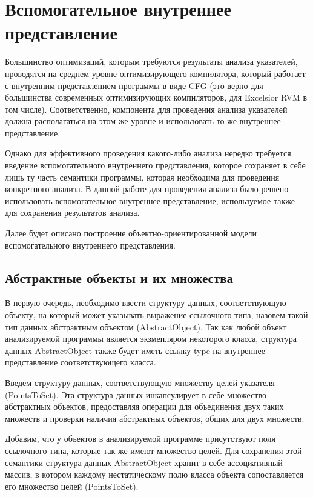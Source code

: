 \documentclass[14pt,titlepage]{extarticle}
\newcommand{\eng}[1]{{\English#1}}
\let\oldsection\section
\renewcommand{\section}{\newpage\oldsection}
\begin{document}
  \section{Вспомогательное внутреннее представление}
    \label{section:analysis_aux_ir}

    Большинство оптимизаций, которым требуются результаты анализа указателей,
    проводятся на среднем уровне оптимизирующего компилятора, который
    работает с внутренним представлением программы в виде CFG (это верно для
    большинства современных оптимизирующих компиляторов, для \eng{Excelsior}
    RVM в том числе). Соответственно, компонента для проведения анализа
    указателей должна располагаться на этом же уровне и использовать то же
    внутреннее представление.

    Однако для эффективного проведения какого-либо анализа нередко требуется
    введение вспомогательного внутреннего представления, которое сохраняет в
    себе лишь ту часть семантики программы, которая необходима для проведения
    конкретного анализа. В данной работе для проведения анализа было решено
    использовать вспомогательное внутреннее представление, используемое также
    для сохранения результатов анализа.

    Далее будет описано построение объектно-ориентированной модели
    вспомогательного внутреннего представления.

    \subsection{Абстрактные объекты и их множества}

      В первую очередь, необходимо ввести структуру данных, соответствующую
      объекту, на который может указывать выражение ссылочного типа, назовем
      такой тип данных абстрактным объектом (\eng{AbstractObject}). Так как
      любой объект анализируемой программы является экзмепляром некоторого
      класса, структура данных \eng{AbstractObject} также будет иметь ссылку
      \eng{type} на внутреннее представление соответствующего класса.

      Введем структуру данных, соответствующую множеству целей указателя
      (\eng{Points\-To\-Set}). Эта структура данных инкапсулирует в себе
      множество абстрактных объектов, предоставляя операции для объединения двух
      таких множеств и проверки наличия абстрактных объектов, общих для двух
      множеств.

      Добавим, что у объектов в анализируемой программе присутствуют поля
      ссылочного типа, которые так же имеют множество целей. Для сохранения
      этой семантики структура данных \eng{AbstractObject} хранит в себе
      ассоциативный массив, в котором каждому нестатическому полю класса объекта
      сопоставляется его множество целей (\eng{PointsToSet}).
\end{document}
